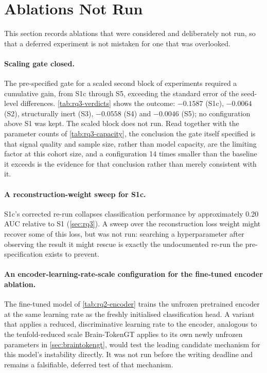 \section{Ablations Not Run}\label{sec:ablations-not-run}

This section records ablations that were considered and deliberately not run, so that a
deferred experiment is not mistaken for one that was overlooked.

\paragraph{Scaling gate closed.} The pre-specified gate for a scaled second block of
experiments required a cumulative gain, from S1c through S5, exceeding the standard error
of the seed-level differences. \autoref{tab:rq3-verdicts} shows the outcome: $-0.1587$
(S1c), $-0.0064$ (S2), structurally inert (S3), $-0.0558$ (S4) and $-0.0046$ (S5); no configuration
above S1 was kept. The scaled block does not run. Read together with the parameter counts
of \autoref{tab:rq3-capacity}, the conclusion the gate itself specified is that signal
quality and sample size, rather than model capacity, are the limiting factor at this cohort
size, and a configuration 14 times smaller than the baseline it exceeds is the evidence for
that conclusion rather than merely consistent with it.

\paragraph{A reconstruction-weight sweep for S1c.} S1c's corrected re-run collapses
classification performance by approximately 0.20 \ac{AUC} relative to S1
(\autoref{sec:rq3}). A sweep over the reconstruction loss weight might recover some of this
loss, but was not run: searching a hyperparameter after observing the result it might rescue
is exactly the undocumented re-run the pre-specification exists to prevent.

\paragraph{An encoder-learning-rate-scale configuration for the fine-tuned encoder ablation.} The
fine-tuned model of \autoref{tab:rq2-encoder} trains the unfrozen pretrained encoder at the
same learning rate as the freshly initialised classification head. A variant that applies a
reduced, discriminative learning rate to the encoder, analogous to the tenfold-reduced scale
Brain-TokenGT applies to its own newly unfrozen parameters in \autoref{sec:braintokengt},
would test the leading candidate mechanism for this model's instability directly. It was not
run before the writing deadline and remains a falsifiable, deferred test of that mechanism.

